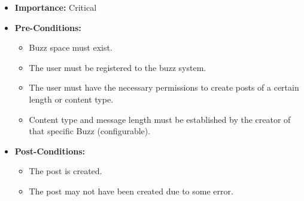 \documentclass[11pt]{article}
\begin{document}
\begin{enumerate}
\begin{itemize}
\item \textbf{Importance:} Critical\newline
\item \textbf{Pre-Conditions: }
	\begin{itemize}
	\item Buzz space must exist.
	\item The user must be registered to the buzz system.
	\item The user must have the necessary permissions to create posts of a certain length or content type.
	\item Content type and message length must be established by the creator of that specific Buzz (configurable).
	\end{itemize}

\item \textbf{Post-Conditions: }
	\begin{itemize}
	\item The post is created.
	\item The post may not have been created due to some error.
	\end{itemize}
\end{itemize}


\end{enumerate}
\end{document}
